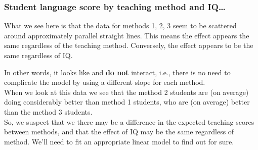 \documentclass{beamer}\usepackage[]{graphicx}\usepackage[]{xcolor}
\begin{document}
\begin{frame}[fragile]
\frametitle{Student language score by  teaching method and IQ\ldots}

What we see here is that the data for methods 1, 2, 3 seem to be scattered around approximately parallel straight lines. This means the  effect appears the same regardless of the teaching method. Conversely, the  effect appears to be the same regardless of IQ. \\
\bigskip

In other words, it looks like  and  {\bf do not} interact, i.e., there is no need to complicate the model by using a different slope for each method.  \\
\bigskip 
When we look at this data we see that the method 2 students are (on average) doing considerably better than method 1 students,  who are (on average) better than the method 3 students.\\
\bigskip
So, we suspect that we there may be a difference in the expected teaching scores between methods, and that the effect of IQ may be the same regardless of method. We'll need to   fit an appropriate linear model to find out for sure.\\
\end{frame}
\end{document}
